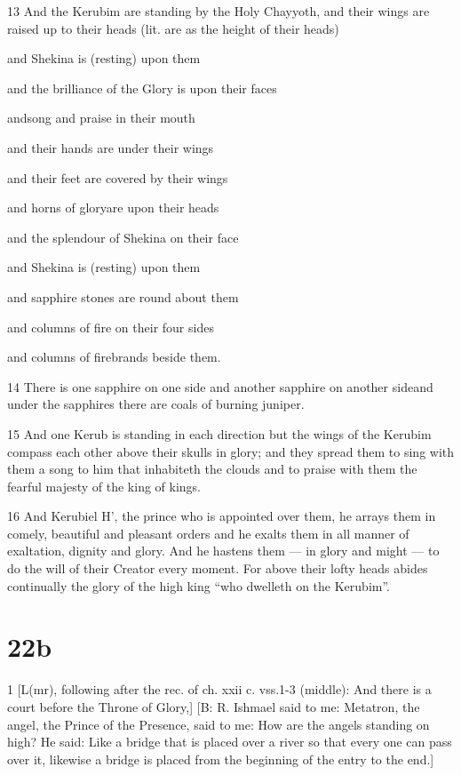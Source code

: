 \par 13 And the Kerubim are standing by the Holy Chayyoth, and their wings are raised up to their heads (lit. are as the height of their heads) 
\par and Shekina is (resting) upon them 
\par and the brilliance of the Glory is upon their faces 
\par andsong and praise in their mouth 
\par and their hands are under their wings 
\par and their feet are covered by their wings
\par and horns of gloryare upon their heads 
\par and the splendour of Shekina on their face 
\par and Shekina is (resting) upon them 
\par and sapphire stones are round about them 
\par and columns of fire on their four sides 
\par and columns of firebrands beside them. 

\par 14 There is one sapphire on one side and another sapphire on another sideand under the sapphires there are coals of burning juniper. 

\par 15 And one Kerub is standing in each direction but the wings of the Kerubim compass each other above their skulls in glory; and they spread them to sing with them a song to him that inhabiteth the clouds and to praise with them the fearful majesty of the king of kings. 

\par 16 And Kerubiel H', the prince who is appointed over them, he arrays them in comely, beautiful and pleasant orders and he exalts them in all manner of exaltation, dignity and glory. And he hastens them — in glory and might — to do the will of their Creator every moment. For above their lofty heads abides continually the glory of the high king “who dwelleth on the Kerubim”. 

\chapter{22b}

\par 1 [L(mr), following after the rec. of ch. xxii c. vss.1-3 (middle): And there is a court before the Throne of Glory,] [B: R. Ishmael said to me: Metatron, the angel, the Prince of the Presence, said to me: How are the angels standing on high? He said: Like a bridge that is placed over a river so that every one can pass over it, likewise a bridge is placed from the beginning of the entry to the end.] 

